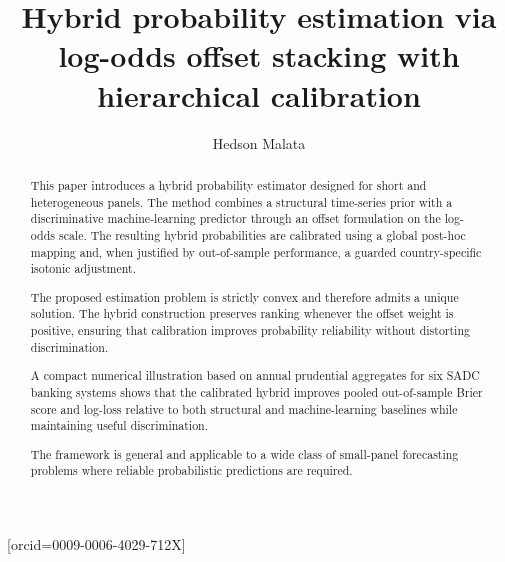 \documentclass[a4paper,fleqn]{cas-dc}
\begin{document}
	
	\let\WriteBookmarks\relax
	\def\floatpagepagefraction{1}
	\def\textpagefraction{.001}
	
	
	\title[mode=title]{Hybrid probability estimation via log-odds offset stacking with hierarchical calibration}
	
	\tnotemark[1]
	
\author[1]{Hedson Malata}[orcid=0009-0006-4029-712X]

\cormark[1]


	
	
	
	
	\begin{abstract}
		This paper introduces a hybrid probability estimator designed for short and heterogeneous panels. 
		The method combines a structural time-series prior with a discriminative machine-learning predictor through an offset formulation on the log-odds scale. The resulting hybrid probabilities are calibrated using a global post-hoc mapping and, when justified by out-of-sample performance, a guarded country-specific isotonic adjustment.
		
		The proposed estimation problem is strictly convex and therefore admits a unique solution. The hybrid construction preserves ranking whenever the offset weight is positive, ensuring that calibration improves probability reliability without distorting discrimination.
		
		A compact numerical illustration based on annual prudential aggregates for six SADC banking systems shows that the calibrated hybrid improves pooled out-of-sample Brier score and log-loss relative to both structural and machine-learning baselines while maintaining useful discrimination.
		
		The framework is general and applicable to a wide class of small-panel forecasting problems where reliable probabilistic predictions are required.
	\end{abstract}
	
\end{document}
